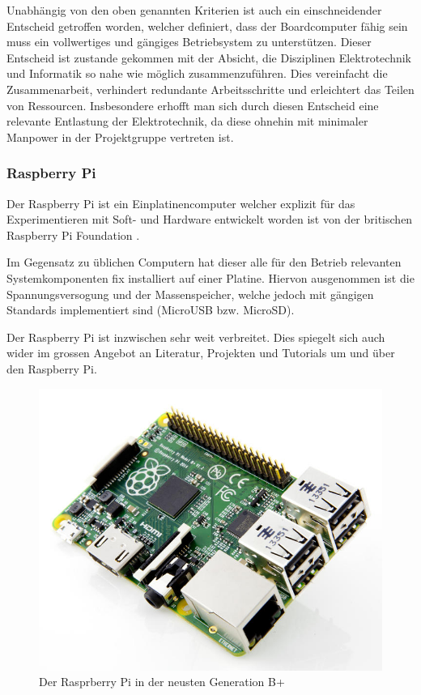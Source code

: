 Unabhängig von den oben genannten Kriterien ist auch ein einschneidender
Entscheid getroffen worden, welcher definiert, dass der Boardcomputer
fähig sein muss ein vollwertiges und gängiges Betriebsystem zu 
unterstützen. Dieser Entscheid ist zustande gekommen mit der Absicht, die
Disziplinen Elektrotechnik und Informatik so nahe wie möglich 
zusammenzuführen. Dies vereinfacht die Zusammenarbeit, verhindert 
redundante Arbeitsschritte und erleichtert das Teilen von Ressourcen.
Insbesondere erhofft man sich durch diesen Entscheid eine relevante 
Entlastung der Elektrotechnik, da diese ohnehin mit minimaler Manpower in
der Projektgruppe vertreten ist.

\subsubsection{Raspberry Pi}
Der Raspberry Pi ist ein Einplatinencomputer welcher explizit für
das Experimentieren mit Soft- und Hardware entwickelt worden ist von
der britischen Raspberry Pi Foundation \cite{RPiFoundation}.

Im Gegensatz zu üblichen Computern hat dieser alle für den Betrieb
relevanten Systemkomponenten fix installiert auf einer Platine. Hiervon
ausgenommen ist die Spannungsversogung und der Massenspeicher, welche
jedoch mit gängigen Standards implementiert sind (MicroUSB bzw. MicroSD).

Der Raspberry Pi ist inzwischen sehr weit verbreitet. Dies spiegelt sich
auch wider im grossen Angebot an Literatur, Projekten und Tutorials um
und über den Raspberry Pi.

\begin{figure}[h!]
	\centering
	\includegraphics[scale=1]{../../fig/raspberry-pi-b-plus.jpg}
	\caption{Der Rasprberry Pi in der neusten Generation B+ 
		\protect\cite{cnet}}
\end{figure}

